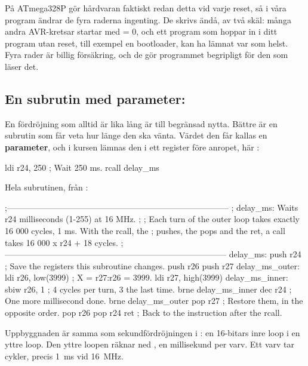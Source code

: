 \noindent På ATmega328P gör hårdvaran faktiskt redan detta vid varje reset, så i våra program
ändrar de fyra raderna ingenting. De skrivs ändå, av två skäl: många andra AVR-kretsar startar med
 = 0, och ett program som hoppar in i ditt program utan reset, till exempel en bootloader,
kan ha lämnat  var som helst. Fyra rader är billig försäkring, och de gör programmet
begripligt för den som läser det.

\subsection{En subrutin med parameter: }
\label{c10:c4}
En fördröjning som alltid är lika lång är till begränsad nytta. Bättre är en subrutin som får veta
hur länge den ska vänta. Värdet den får kallas en \textbf{parameter}, och i kursen lämnas den i
ett register före anropet, här :

\begin{asmcode}
    ldi r24, 250                    ; Wait 250 ms.
    rcall delay_ms
\end{asmcode}

\noindent Hela subrutinen, från :

\begin{asmcode}
;--------------------------------------------------------------------------------
; delay_ms: Waits r24 milliseconds (1-255) at 16 MHz.
;
; Each turn of the outer loop takes exactly 16 000 cycles, 1 ms. With the rcall, the
; pushes, the pops and the ret, a call takes 16 000 x r24 + 18 cycles.
;--------------------------------------------------------------------------------
delay_ms:
    push r24                        ; Save the registers this subroutine changes.
    push r26
    push r27
delay_ms_outer:
    ldi r26, low(3999)              ; X = r27:r26 = 3999.
    ldi r27, high(3999)
delay_ms_inner:
    sbiw r26, 1                     ; 4 cycles per turn, 3 the last time.
    brne delay_ms_inner
    dec r24                         ; One more millisecond done.
    brne delay_ms_outer
    pop r27                         ; Restore them, in the opposite order.
    pop r26
    pop r24
    ret                             ; Back to the instruction after the rcall.
\end{asmcode}

\noindent Uppbyggnaden är samma som sekundfördröjningen i : en 16-bitars inre loop
i en yttre loop. Den yttre loopen räknar ned , en millisekund per varv. Ett varv tar
\mbox{} cykler, precis 1~ms vid 16~MHz.

